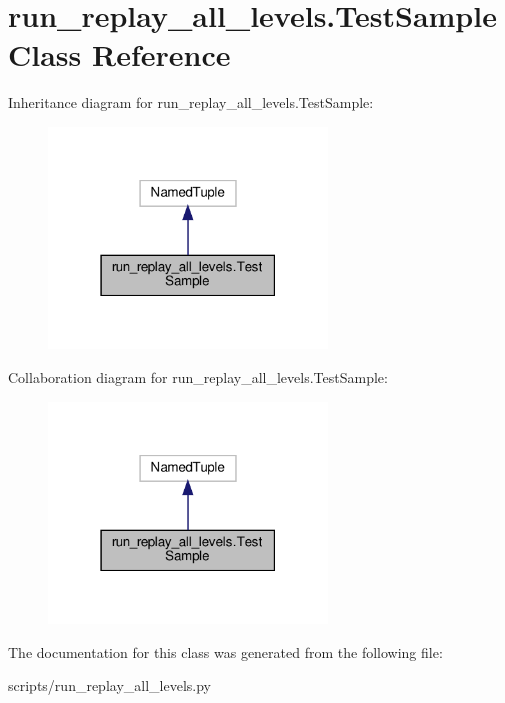 \hypertarget{classrun__replay__all__levels_1_1TestSample}{}\section{run\+\_\+replay\+\_\+all\+\_\+levels.\+Test\+Sample Class Reference}
\label{classrun__replay__all__levels_1_1TestSample}


Inheritance diagram for run\+\_\+replay\+\_\+all\+\_\+levels.\+Test\+Sample\+:
\nopagebreak
\begin{figure}[H]
\begin{center}
\leavevmode
\includegraphics[width=210pt]{classrun__replay__all__levels_1_1TestSample__inherit__graph}
\end{center}
\end{figure}


Collaboration diagram for run\+\_\+replay\+\_\+all\+\_\+levels.\+Test\+Sample\+:
\nopagebreak
\begin{figure}[H]
\begin{center}
\leavevmode
\includegraphics[width=210pt]{classrun__replay__all__levels_1_1TestSample__coll__graph}
\end{center}
\end{figure}


The documentation for this class was generated from the following file\+:\begin{DoxyCompactItemize}
\item 
scripts/run\+\_\+replay\+\_\+all\+\_\+levels.\+py\end{DoxyCompactItemize}
